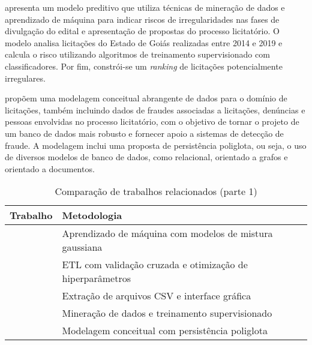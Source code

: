 \cite{jesus2021modelo} apresenta um modelo preditivo que utiliza técnicas de mineração de dados e aprendizado de máquina para indicar riscos de irregularidades nas fases de divulgação do edital e apresentação de propostas do processo licitatório. O modelo analisa licitações do Estado de Goiás realizadas entre 2014 e 2019 e calcula o risco utilizando algoritmos de treinamento supervisionado com classificadores. Por fim, constrói-se um \textit{ranking} de licitações potencialmente irregulares.

\cite{mello2024sbbd_estendido} propõem uma modelagem conceitual abrangente de dados para o domínio de licitações, também incluindo dados de fraudes associadas a licitações, denúncias e pessoas envolvidas no processo licitatório, com o objetivo de tornar o projeto de um banco de dados mais robusto e fornecer apoio a sistemas de detecção de fraude. A modelagem inclui uma proposta de persistência poliglota, ou seja, o uso de diversos modelos de banco de dados, como relacional, orientado a grafos e orientado a documentos. 

\begin{table}[h]
\caption{Comparação de trabalhos relacionados (parte 1)}
\label{tab:trabalhos-relacionados-1}
\center
\begin{tabular}{| l | p{7cm} |}
\hline
\textbf{Trabalho} & \textbf{Metodologia} \\ \hline
\cite{schmitz2024sbbd} & Aprendizado de máquina com modelos de mistura gaussiana \\ \hline
\cite{schneider2024sbbd} & ETL com validação cruzada e otimização de hiperparâmetros \\ \hline
\cite{santos2021ferramenta} & Extração de arquivos CSV e interface gráfica \\ \hline
\cite{jesus2021modelo} & Mineração de dados e treinamento supervisionado \\ \hline
\cite{mello2024sbbd_estendido} & Modelagem conceitual com persistência poliglota \\ \hline
\end{tabular}
\end{table}

